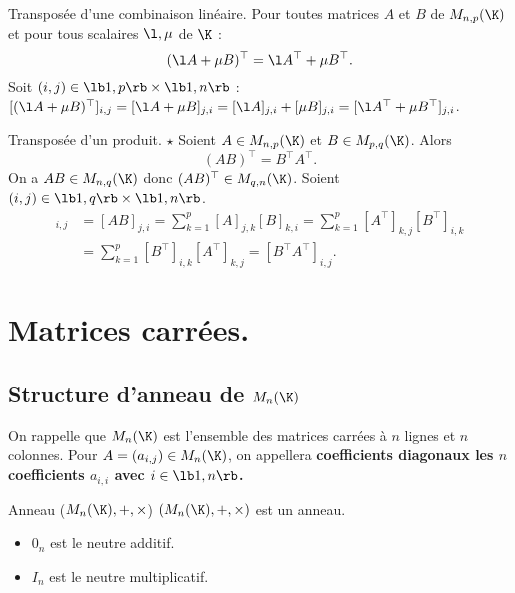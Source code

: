\documentclass[11pt]{article}
\begin{document}
\begin{prop}{Transposée d'une combinaison linéaire.}{}
    Pour toutes matrices $A$ et $B$ de $M_{n,p}(\K)$ et pour tous scalaires $\l,\mu$ de $\K$ :
    \begin{equation*}
        (\l A + \mu B)^{\top} = \l A^{\top} + \mu B^{\top}.
    \end{equation*}
    \tcblower
    Soit $(i,j)\in\lb1,p\rb\times\lb1,n\rb$ : $[(\l A+\mu B)^\top]_{i,j}=[\l A + \mu B]_{j,i}=[\l A]_{j,i}+[\mu B]_{j,i}=[\l A^\top + \mu B^\top]_{j,i}$.
\end{prop}

\pagebreak

\begin{prop}{Transposée d'un produit. $\star$}{}
    Soient $A\in M_{n,p}(\K)$ et $B\in M_{p,q}(\K)$. Alors
    \begin{equation*}
        (AB)^\top = B^\top A^\top.
    \end{equation*}
    \tcblower
    On a $AB\in M_{n,q}(\K)$ donc $(AB)^\top\in M_{q,n}(\K)$. Soient $(i,j)\in\lb1,q\rb\times\lb1,n\rb$.
    \begin{align*}
        [(AB)^\top]_{i,j}&=[AB]_{j,i}=\sum_{k=1}^p[A]_{j,k}[B]_{k,i}=\sum_{k=1}^p[A^\top]_{k,j}[B^\top]_{i,k}\\
        &=\sum_{k=1}^p[B^\top]_{i,k}[A^\top]_{k,j}=[B^\top A^\top]_{i,j}.
    \end{align*}
\end{prop}

\section{Matrices carrées.}

\subsection{Structure d'anneau de \texorpdfstring{$M_n(\K)$}{Lg}}
On rappelle que $M_n(\K)$ est l'ensemble des matrices carrées à $n$ lignes et $n$ colonnes.\n
Pour $A=(a_{i,j})\in M_n(\K)$, on appellera \bf{coefficients diagonaux} les $n$ coefficients $a_{i,i}$ avec $i\in\lb1,n\rb$.

\begin{prop}{Anneau ($M_n(\K), +, \times$)}{}
    $(M_n(\K),+,\times)$ est un anneau.
    \begin{itemize}
        \item $0_n$ est le neutre additif.
        \item $I_n$ est le neutre multiplicatif.
    \end{itemize}
\end{prop}
\end{document}

